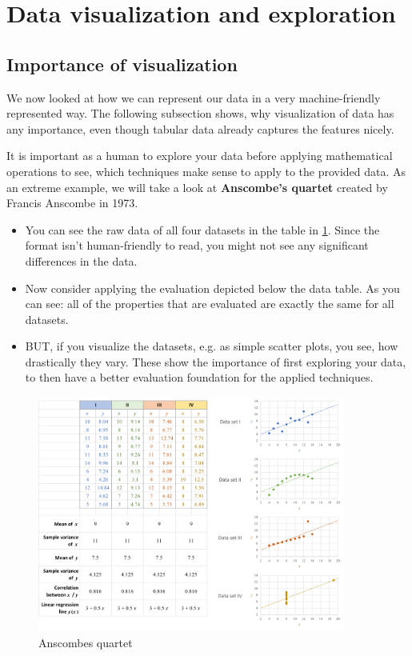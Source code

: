 \section{Data visualization and exploration}
\setcounter{figure}{0}



\subsection*{Importance of visualization}
We now looked at how we can represent our data in a very machine-friendly represented way. The following subsection shows, why visualization of data has any importance, even though tabular data already captures the features nicely.

It is important as a human to explore your data before applying mathematical operations to see, which techniques make sense to apply to the provided data. As an extreme example, we will take a look at \textbf{Anscombe's quartet} created by Francis Anscombe in 1973. 
\begin{itemize}
  \item You can see the raw data of all four datasets in the table in \ref{fig:2_anscombes_quartet}. Since the format isn't human-friendly to read, you might not see any significant differences in the data.
  \item Now consider applying the evaluation depicted below the data table. As you can see: all of the properties that are evaluated are exactly the same for all datasets.
  \item BUT, if you visualize the datasets, e.g. as simple scatter plots, you see, how drastically they vary. These show the importance of first exploring your data, to then have a better evaluation foundation for the applied techniques.
\end{itemize} 

\begin{figure}[H]
  \centering
  \includegraphics[width=0.9\textwidth]{assets/visualization_and_extraction/anscombes_quartet.png}
  \caption{Anscombes quartet}
  \label{fig:2_anscombes_quartet}
\end{figure}

